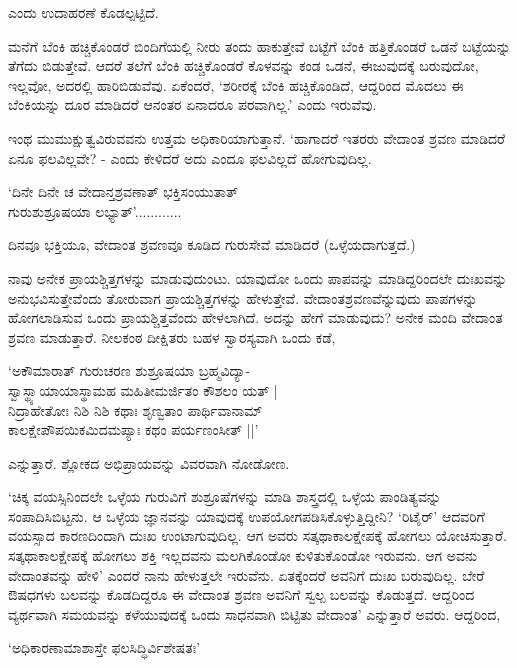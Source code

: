 ಎಂದು ಉದಾಹರಣೆ ಕೊಡಲ್ಪಟ್ಟಿದೆ.

ಮನೆಗೆ ಬೆಂಕಿ ಹಚ್ಚಿಕೊಂಡರೆ ಬಿಂದಿಗೆಯಲ್ಲಿ ನೀರು ತಂದು ಹಾಕುತ್ತೇವೆ ಬಟ್ಟೆಗೆ ಬೆಂಕಿ ಹತ್ತಿಕೊಂಡರೆ ಒಡನೆ ಬಟ್ಟೆಯನ್ನು ತೆಗೆದು ಬಿಡುತ್ತೇವೆ. ಆದರೆ ತಲೆಗೆ ಬೆಂಕಿ ಹಚ್ಚಿಕೊಂಡರೆ ಕೊಳವನ್ನು ಕಂಡ ಒಡನೆ, ಈಜುವುದಕ್ಕೆ ಬರುವುದೋ, ಇಲ್ಲವೋ, ಅದರಲ್ಲಿ ಹಾರಿಬಿಡುವೆವು. ಏಕೆಂದರೆ, `ಶರೀರಕ್ಕೆ ಬೆಂಕಿ ಹಚ್ಚಿಕೊಂಡಿದೆ, ಆದ್ದರಿಂದ ಮೊದಲು ಈ ಬೆಂಕಿಯನ್ನು ದೂರ ಮಾಡಿದರೆ ಆನಂತರ ಏನಾದರೂ ಪರವಾಗಿಲ್ಲ.' ಎಂದು ಇರುವೆವು.

ಇಂಥ ಮುಮುಕ್ಷುತ್ವವಿರುವವನು ಉತ್ತಮ ಅಧಿಕಾರಿಯಾಗುತ್ತಾನೆ. `ಹಾಗಾದರೆ ಇತರರು ವೇದಾಂತ ಶ್ರವಣ ಮಾಡಿದರೆ ಏನೂ ಫಲವಿಲ್ಲವೇ? - ಎಂದು ಕೇಳಿದರೆ ಅದು ಎಂದೂ ಫಲವಿಲ್ಲದೆ ಹೋಗುವುದಿಲ್ಲ.

\begin{shloka}
`ದಿನೇ ದಿನೇ ಚ ವೇದಾನ್ತಶ್ರವಣಾತ್ ಭಕ್ತಿಸಂಯುತಾತ್\\
ಗುರುಶುಶ್ರೂಷಯಾ ಲಭ್ಯಾತ್'............
\end{shloka}

ದಿನವೂ ಭಕ್ತಿಯೂ, ವೇದಾಂತ ಶ್ರವಣವೂ ಕೂಡಿದ ಗುರುಸೇವೆ ಮಾಡಿದರೆ (ಒಳ್ಳೆಯದಾಗುತ್ತದೆ.)

ನಾವು ಅನೇಕ ಪ್ರಾಯಶ್ಚಿತ್ತಗಳನ್ನು ಮಾಡುವುದುಂಟು. ಯಾವುದೋ ಒಂದು ಪಾಪವನ್ನು ಮಾಡಿದ್ದರಿಂದಲೇ ದುಃಖವನ್ನು ಅನುಭವಿಸುತ್ತೇವೆಂದು ತೋರುವಾಗ ಪ್ರಾಯಶ್ಚಿತ್ತಗಳನ್ನು ಹೇಳುತ್ತೇವೆ. ವೇದಾಂತಶ್ರವಣವೆನ್ನುವುದು ಪಾಪಗಳನ್ನು ಹೋಗಲಾಡಿಸುವ ಒಂದು ಪ್ರಾಯಶ್ಚಿತ್ತವೆಂದು ಹೇಳಲಾಗಿದೆ. ಅದನ್ನು ಹೇಗೆ ಮಾಡುವುದು? ಅನೇಕ ಮಂದಿ ವೇದಾಂತ ಶ್ರವಣ ಮಾಡುತ್ತಾರೆ. ನೀಲಕಂಠ ದೀಕ್ಷಿತರು ಬಹಳ ಸ್ವಾರಸ್ಯವಾಗಿ ಒಂದು ಕಡೆ,

\begin{shloka}
`ಅಕೌಮಾರಾತ್ ಗುರುಚರಣ ಶುಶ್ರೂಷಯಾ ಬ್ರಹ್ಮವಿದ್ಯಾ-\\
ಸ್ವಾಸ್ಥ್ಯಾಯಾಯಾಸ್ಥಾಮಹ ಮಹಿತೀಮರ್ಜಿತಂ ಕೌಶಲಂ ಯತ್ |\\
ನಿದ್ರಾಹೇತೋಃ ನಿಶಿ ನಿಶಿ ಕಥಾಃ ಶೃಣ್ವತಾಂ ಪಾರ್ಥಿವಾನಾಮ್\\
ಕಾಲಕ್ಷೇಪೌಪಯಿಕಮಿದಮಪ್ಯಾಃ ಕಥಂ ಪರ್ಯಣಂಸೀತ್ ||'
\end{shloka}

ಎನ್ನುತ್ತಾರೆ. ಶ್ಲೋಕದ ಅಭಿಪ್ರಾಯವನ್ನು ವಿವರವಾಗಿ ನೋಡೋಣ.

`ಚಿಕ್ಕ ವಯಸ್ಸಿನಿಂದಲೇ ಒಳ್ಳೆಯ ಗುರುವಿಗೆ ಶುಶ್ರೂಷೆಗಳನ್ನು ಮಾಡಿ ಶಾಸ್ತ್ರದಲ್ಲಿ ಒಳ್ಳೆಯ ಪಾಂಡಿತ್ಯವನ್ನು ಸಂಪಾದಿಸಿಬಿಟ್ಟನು. ಆ ಒಳ್ಳೆಯ ಜ್ಞಾನವನ್ನು ಯಾವುದಕ್ಕೆ ಉಪಯೋಗಪಡಿಸಿಕೊಳ್ಳುತ್ತಿದ್ದೀನಿ? `ರಿಟೈರ್' ಆದವರಿಗೆ ವಯಸ್ಸಾದ ಕಾರಣದಿಂದಾಗಿ ದುಃಖ ಉಂಟಾಗುವುದಿಲ್ಲ. ಆಗ ಅವರು ಸತ್ಕಥಾಕಾಲಕ್ಷೇಪಕ್ಕೆ ಹೋಗಲು ಯೋಚಿಸುತ್ತಾರೆ. ಸತ್ಕಥಾಕಾಲಕ್ಷೇಪಕ್ಕೆ ಹೋಗಲು ಶಕ್ತಿ ಇಲ್ಲದವನು ಮಲಗಿಕೊಂಡೋ ಕುಳಿತುಕೊಂಡೋ ಇರುವನು. ಆಗ ಅವನು ವೇದಾಂತವನ್ನು ಹೇಳಿ' ಎಂದರೆ ನಾನು ಹೇಳುತ್ತಲೇ ಇರುವೆನು. ಏತಕ್ಕೆಂದರೆ ಅವನಿಗೆ ದುಃಖ ಬರುವುದಿಲ್ಲ. ಬೇರೆ ಔಷಧಗಳು ಬಲವನ್ನು ಕೊಡದಿದ್ದರೂ ಈ ವೇದಾಂತ ಶ್ರವಣ ಅವನಿಗೆ ಸ್ವಲ್ಪ ಬಲವನ್ನು ಕೊಡುತ್ತದೆ. ಆದ್ದರಿಂದ ವ್ಯರ್ಥವಾಗಿ ಸಮಯವನ್ನು ಕಳೆಯುವುದಕ್ಕೆ ಒಂದು ಸಾಧನವಾಗಿ ಬಿಟ್ಟಿತು ವೇದಾಂತ' ಎನ್ನುತ್ತಾರೆ ಅವರು. ಆದ್ದರಿಂದ,

\begin{shloka}
`ಅಧಿಕಾರಣಾಮಾಶಾಸ್ತೇ ಫಲಸಿದ್ಧಿರ್ವಿಶೇಷತಃ'
\end{shloka}

